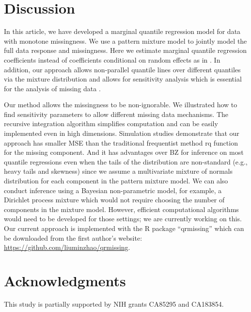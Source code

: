 \documentclass[12pt]{article}
\begin{document}

\section{Discussion}
\label{ch3:sec:discussion}

In this article, we have developed a marginal quantile regression model
for data with monotone missingness. We use a pattern mixture model to
jointly model the full data response and missingness. Here we estimate
marginal quantile regression coefficients instead of coefficients
conditional on random effects as in \citet{yuan2010}. In addition, our
approach allows non-parallel quantile lines over different quantiles
via the mixture distribution and allows for sensitivity analysis which
is essential for the analysis of missing data \citep{nas2010}.

Our method allows the missingness to be non-ignorable.
We illustrated how to find sensitivity parameters to allow different missing data mechanisms.
The recursive integration algorithm simplifies computation and can be easily implemented even in high dimensions.
Simulation studies demonstrate that our approach has smaller MSE than the traditional frequentist method rq function for the missing component.
And it has advantages over BZ for inference on most quantile regressions even when the tails of the distribution are non-standard (e.g., heavy tails and skewness) since we assume a
multivariate mixture of normals distribution for each component in the pattern mixture model.
We can also conduct inference using a Bayesian non-parametric model, for example, a Dirichlet process mixture which would not require choosing the number of components in the mixture model.
However, efficient computational algorithms would need to be developed for those settings;  we are currently working on this.
Our current approach is implemented with the R package ``qrmissing'' which can be downloaded from the first author's website: \url{https://github.com/liuminzhao/qrmissing}.

\section*{Acknowledgments}

This study is partially supported by NIH grants CA85295 and CA183854.



\end{document}
